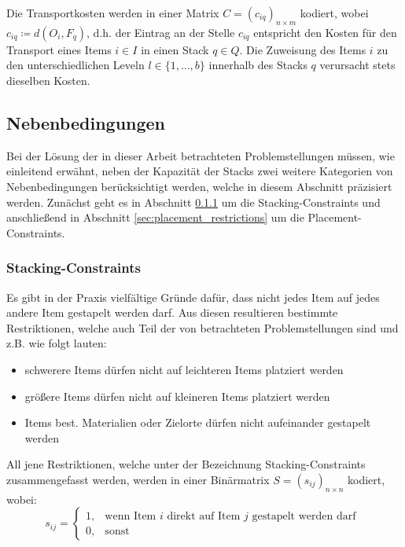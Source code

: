 \vfill
\pagebreak

Die Transportkosten werden in einer Matrix $C = (c_{iq})_{n \times m}$ kodiert,
wobei $c_{iq} \coloneqq d(O_i, F_q)$, d.h. der Eintrag an der Stelle $c_{iq}$ entspricht
den Kosten für den Transport eines Items $i \in I$ in einen Stack $q \in Q$.
Die Zuweisung des Items $i$ zu den unterschiedlichen Leveln $l \in \{1, \dotsc, b\}$ innerhalb des Stacks $q$
verursacht stets dieselben Kosten.

\subsection{Nebenbedingungen}
\label{sec:constraints}

Bei der Lösung der in dieser Arbeit betrachteten Problemstellungen müssen, wie einleitend erwähnt,
neben der Kapazität der Stacks zwei weitere Kategorien von Nebenbedingungen berücksichtigt werden, welche in diesem Abschnitt
präzisiert werden. Zunächst geht es in Abschnitt \ref{sec:stacking_restrictions} um die Stacking-Constraints
und anschließend in Abschnitt \ref{sec:placement_restrictions} um die Placement-Constraints.

\subsubsection{Stacking-Constraints}
\label{sec:stacking_restrictions}

Es gibt in der Praxis vielfältige Gründe dafür, dass nicht jedes Item auf jedes andere Item gestapelt werden darf.
Aus diesen resultieren bestimmte Restriktionen, welche auch Teil der von \citet{Bruns2015} betrachteten Problemstellungen
sind und z.B. wie folgt lauten:
\begin{itemize}
  \item schwerere Items dürfen nicht auf leichteren Items platziert werden
  \item größere Items dürfen nicht auf kleineren Items platziert werden
  \item Items best. Materialien oder Zielorte dürfen nicht aufeinander gestapelt werden
\end{itemize}

All jene Restriktionen, welche unter der Bezeichnung Stacking-Constraints zusammengefasst werden,
werden in einer Binärmatrix $S = (s_{ij})_{n \times n}$ kodiert, wobei:
\[
    s_{ij} =
\begin{cases}
    1, & \text{wenn Item $i$ direkt auf Item $j$ gestapelt werden darf }\\
    0, & \text{sonst}
\end{cases}
\]

